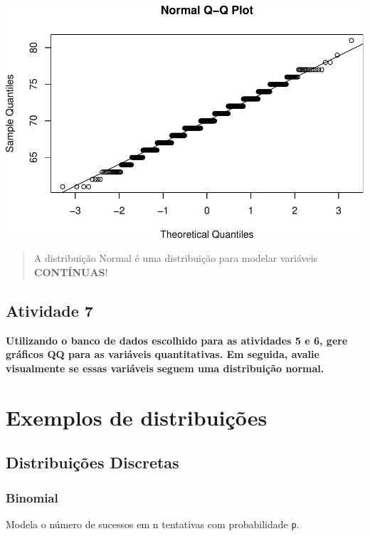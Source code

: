 \documentclass[
]{book}
\begin{document}
\includegraphics{LivroEstatisticaR_files/figure-latex/unnamed-chunk-33-2.pdf}

\begin{quote}
A distribuição Normal é uma distribuição para modelar variáveis \textbf{CONTÍNUAS}!
\end{quote}

\section{Atividade 7}\label{atividade-7}

\textbf{Utilizando o banco de dados escolhido para as atividades 5 e 6, gere gráficos QQ para as variáveis quantitativas. Em seguida, avalie visualmente se essas variáveis seguem uma distribuição normal.}

\chapter{Exemplos de distribuições}\label{exemplos-de-distribuiuxe7uxf5es}

\section{Distribuições Discretas}\label{distribuiuxe7uxf5es-discretas}

\subsection{Binomial}\label{binomial}

Modela o número de sucessos em n tentativas com probabilidade \texttt{p}.
\end{document}
